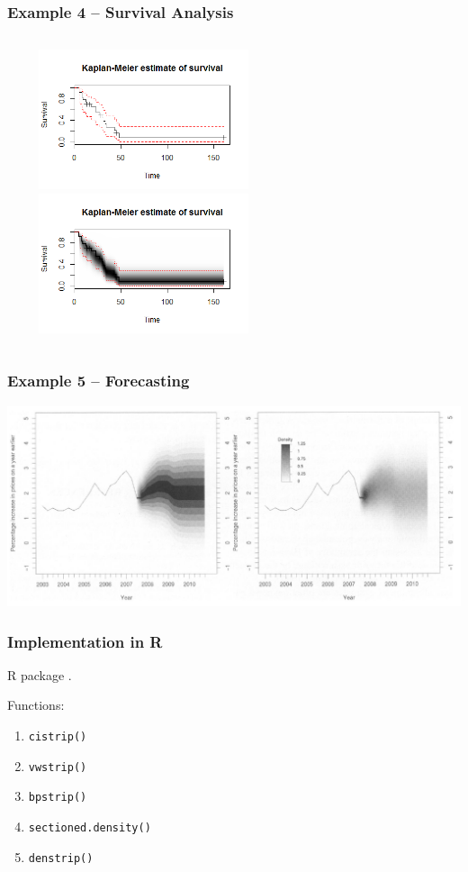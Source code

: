 \documentclass[11pt,usenames,dvipsnames,svgnames,x11names]{beamer}
\theoremstyle{plain}
\theoremstyle{definition}
\theoremstyle{remark}
\begin{document}
\begin{frame}
	\frametitle{Example 4 -- Survival Analysis}
	\begin{columns}[t]
		\column{\textwidth}
			\centering
			\includegraphics[width=8cm,height=4.1cm]{h.png}\\
			\includegraphics[width=8cm,height=4.1cm]{hh.png}
	\end{columns}
\end{frame}

\begin{frame}
	\frametitle{Example 5 -- Forecasting}
	\centering
	\includegraphics[width=\textwidth]{z.png}
\end{frame}

\begin{frame}
	\frametitle{Implementation in R}
	
	R package . 
	
	\bigskip
	
	Functions:
	\begin{enumerate}
		\item \texttt{cistrip()}
		\item \texttt{vwstrip()}
		\item \texttt{bpstrip()}
		\item \texttt{sectioned.density()}
		\item \texttt{denstrip()}
	\end{enumerate}
	 	
	
\end{frame}
\end{document}
